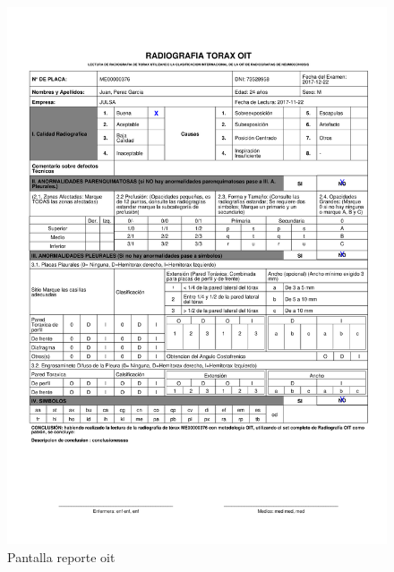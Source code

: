 	\begin{figure}[H]
	    \centering
		\includegraphics[width=18cm]{../imgs/reportes/oit}
		\caption{Pantalla reporte oit}
		\label{figure:reporte-oit}
	\end{figure}